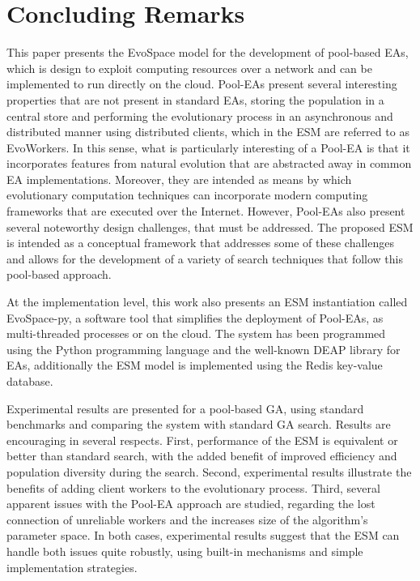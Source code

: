 \section{Concluding Remarks}
\label{sec:conclusions}
This paper presents the EvoSpace model for the development of pool-based EAs, which is design to exploit computing resources over a network and can be
implemented to run directly on the cloud.
Pool-EAs present several interesting properties that are not present in standard EAs, storing the population in a central store and
performing the evolutionary process in an asynchronous and distributed manner using distributed clients, which in the ESM are referred to as EvoWorkers.
In this sense, what is particularly interesting of a Pool-EA is that it incorporates features from natural evolution that are abstracted away in common EA implementations.
Moreover, they are intended as means by which evolutionary computation techniques can incorporate modern computing frameworks that are executed over the Internet.
However, Pool-EAs also present several noteworthy design challenges, that must be addressed.
The proposed ESM is intended as a conceptual framework that addresses some of these challenges and allows for the development of a variety of search techniques
that follow this pool-based approach.

At the implementation level, this work also presents an ESM instantiation called EvoSpace-py, a software tool that simplifies the deployment of Pool-EAs,
as multi-threaded processes or on the cloud.
The system has been programmed using the Python programming language and the well-known DEAP library for EAs, additionally the ESM model is implemented using the Redis key-value database.

Experimental results are presented for a pool-based GA, using standard benchmarks and comparing the system with standard GA search.
Results are encouraging in several respects.
First, performance of the ESM is equivalent or better than standard search, with the added benefit of improved efficiency and population diversity during the search.
Second, experimental results illustrate the benefits of adding client workers to the evolutionary process.
Third, several apparent issues with the Pool-EA approach are studied, regarding the lost connection of unreliable workers and the increases size of the algorithm's parameter space.
In both cases, experimental results suggest that the ESM can handle both issues quite robustly, using built-in mechanisms and simple implementation strategies.

